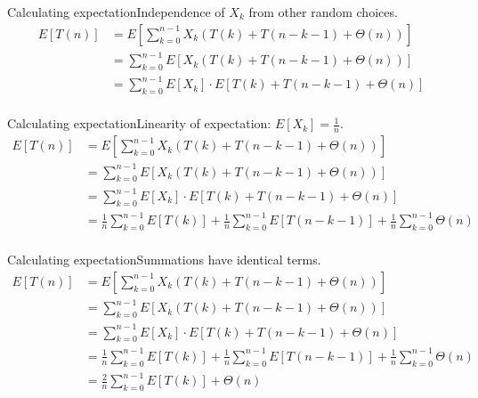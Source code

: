 \documentclass{beamer}
\begin{document}
\begin{frame}{Calculating expectation}{Independence of $X_k$ from other random choices.}
    \begin{equation*}
        \begin{split}
E[T(n)] &= E\left[ \sum\limits_{k=0}^{n-1} X_k(T(k) + T(n - k - 1) + \Theta(n)) \right] \\
        &= \sum\limits_{k=0}^{n-1} E\left[ X_k(T(k) + T(n - k - 1) + \Theta(n)) \right] \\
        &= \sum\limits_{k=0}^{n-1} E[X_k] \cdot E[T(k) + T(n - k - 1) + \Theta(n)] \\
        \end{split}
    \end{equation*}
\end{frame}

\begin{frame}{Calculating expectation}{Linearity of expectation: $E[X_k] = \frac{1}{n}$.}
    \begin{equation*}
        \begin{split}
E[T(n)] &= E\left[ \sum\limits_{k=0}^{n-1} X_k(T(k) + T(n - k - 1) + \Theta(n)) \right] \\
        &= \sum\limits_{k=0}^{n-1} E\left[ X_k(T(k) + T(n - k - 1) + \Theta(n)) \right] \\
        &= \sum\limits_{k=0}^{n-1} E[X_k] \cdot E[T(k) + T(n - k - 1) + \Theta(n)] \\
        &= \frac{1}{n}\sum\limits_{k=0}^{n-1} E[T(k)] +
           \frac{1}{n}\sum\limits_{k=0}^{n-1} E[T(n - k - 1)] +
           \frac{1}{n}\sum\limits_{k=0}^{n-1} \Theta(n) \\
        \end{split}
    \end{equation*}
\end{frame}

\begin{frame}{Calculating expectation}{Summations have identical terms.}
    \begin{equation*}
        \begin{split}
E[T(n)] &= E\left[ \sum\limits_{k=0}^{n-1} X_k(T(k) + T(n - k - 1) + \Theta(n)) \right] \\
        &= \sum\limits_{k=0}^{n-1} E\left[ X_k(T(k) + T(n - k - 1) + \Theta(n)) \right] \\
        &= \sum\limits_{k=0}^{n-1} E[X_k] \cdot E[T(k) + T(n - k - 1) + \Theta(n)] \\
        &= \frac{1}{n}\sum\limits_{k=0}^{n-1} E[T(k)] +
           \frac{1}{n}\sum\limits_{k=0}^{n-1} E[T(n - k - 1)] +
           \frac{1}{n}\sum\limits_{k=0}^{n-1} \Theta(n) \\
        &= \frac{2}{n}\sum\limits_{k=0}^{n-1} E[T(k)] + \Theta(n) \\
        \end{split}
    \end{equation*}
\end{frame}
\end{document}
